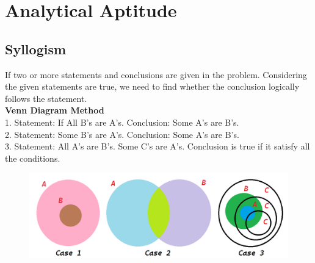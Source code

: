 \section{Analytical Aptitude}
\subsection{Syllogism}
If two or more statements and conclusions are given in the problem. Considering the given statements are true, we need to find whether the conclusion logically follows the statement.\vspace{0.2cm}\\
\textbf{Venn Diagram Method}\\
1. Statement: If All B's are A's. Conclusion: Some A's are B's.\\
2. Statement: Some B's are A's. Conclusion: Some A's are B's.\\
3. Statement: All A's are B's. Some C's are A's. Conclusion is true if it satisfy all the conditions.
\begin{figure}[h!]
    \centering
    \includegraphics[width=\linewidth]{images/syllogism.png}
\end{figure}


